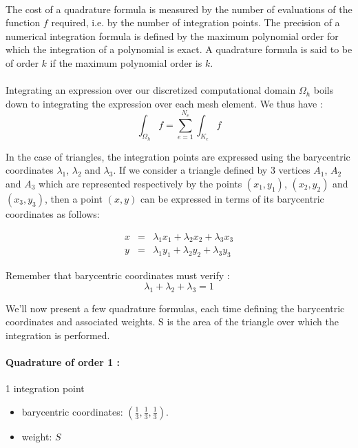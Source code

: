 \documentclass[11pt,a4paper]{article}
\begin{document}
\paragraph{}
The cost of a quadrature formula is measured by the number of evaluations of the function $f$ required, i.e. by the number of integration points.
The precision of a numerical integration formula is defined by the maximum polynomial order for which the integration of a polynomial is exact.
A quadrature formula is said to be of order $k$ if the maximum polynomial order is $k$. 

\paragraph{}
Integrating an expression over our discretized computational domain $\Omega_h$ boils down to integrating the expression over each mesh element.
We thus have :
\begin{equation*}
  \int_{\Omega_h} f = \sum_{e=1}^{N_e} \int_{K_e} f
\end{equation*}

In the case of triangles, the integration points are expressed using the barycentric coordinates $\lambda_1$, $\lambda_2$ and $\lambda_3$.
If we consider a triangle defined by 3 vertices $A_1$, $A_2$ and $A_3$ which are represented respectively by the points $(x_1,y_1)$, $(x_2,y_2)$ and $(x_3,y_3)$, then
a point $(x,y)$ can be expressed in terms of its barycentric coordinates as follows:

\begin{eqnarray*}
  x &=& \lambda_1 x_1 + \lambda_2 x_2 + \lambda_3 x_3 \\
  y &=& \lambda_1 y_1 + \lambda_2 y_2 + \lambda_3 y_3
\end{eqnarray*}


Remember that barycentric coordinates must verify :
\begin{equation*}
  \lambda_1 + \lambda_2 + \lambda_3 = 1
\end{equation*}


We'll now present a few quadrature formulas, each time defining the barycentric coordinates and associated weights.
S is the area of the triangle over which the integration is performed.

\paragraph{Quadrature of order 1 :} 1 integration point
\begin{itemize}
\item barycentric coordinates: $\left(\frac{1}{3},\frac{1}{3},\frac{1}{3}\right)$.
\item weight: $S$
\end{itemize}
\end{document}
